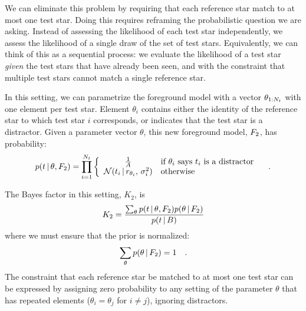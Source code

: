 We can eliminate this problem by requiring that each reference star
match to at most one test star.  Doing this requires reframing the
probabilistic question we are asking.  Instead of assessing the
likelihood of each test star independently, we assess the likelihood
of a single draw of the set of test stars.  Equivalently, we can think
of this as a sequential process: we evaluate the likelihood of a test
star \emph{given} the test stars that have already been seen, and with
the constraint that multiple test stars cannot match a single
reference star.


In this setting, we can parametrize the foreground model with a vector
$\theta_{1:{N_t}}$ with one element per test star.  Element
$\theta_i$ contains either the identity of the reference star to which
test star $i$ corresponds, or indicates that the test star is a
distractor.  Given a parameter vector $\theta$, this new foreground
model, $F_2$, has probability:
\begin{equation}
  p(t \,\vert\, \theta, F_2) = \prod_{i=1}^{{N_t}} \left\{
\begin{array}{cl}
  \frac{1}{A} & \text{if}\  \theta_i \ \text{says $t_i$ is a distractor} \\
  \mathcal{N}(t_i \, | \, r_{\theta_i},\, \sigma_i^2) & \text{otherwise} \\
\end{array} \right. \quad .
\label{eq:pf2}
\end{equation}


The Bayes factor in this setting, $K_2$, is
\begin{equation}
  K_2 = \frac{\sum_{\theta} p(t \,\vert\, \theta, F_2) p(\theta \,\vert\, F_2)}{p(t \,\vert\, B)}
  \label{eq:k2}
\end{equation}
where we must ensure that the prior is normalized:
\begin{equation}
  \sum_{\theta} p(\theta \,\vert\, F_2) = 1 \quad .
\end{equation}
The constraint that each reference star be matched to at most one test
star can be expressed by assigning zero probability to any setting of
the parameter $\theta$ that has repeated elements ($\theta_i =
\theta_j$ for $i \ne j$), ignoring distractors.


